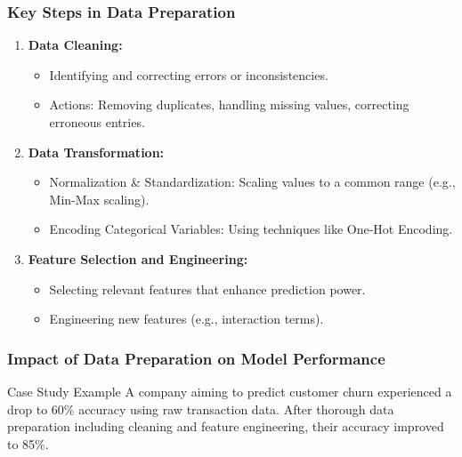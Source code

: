 \documentclass[aspectratio=169]{beamer}
\begin{document}
\begin{frame}[fragile]
    \frametitle{Key Steps in Data Preparation}
    \begin{enumerate}
        \item \textbf{Data Cleaning:}
        \begin{itemize}
            \item Identifying and correcting errors or inconsistencies. 
            \item Actions: Removing duplicates, handling missing values, correcting erroneous entries.
        \end{itemize}
        
        \item \textbf{Data Transformation:}
        \begin{itemize}
            \item Normalization & Standardization: Scaling values to a common range (e.g., Min-Max scaling).
            \item Encoding Categorical Variables: Using techniques like One-Hot Encoding.
        \end{itemize}
        
        \item \textbf{Feature Selection and Engineering:}
        \begin{itemize}
            \item Selecting relevant features that enhance prediction power.
            \item Engineering new features (e.g., interaction terms).
        \end{itemize}
    \end{enumerate}
\end{frame}

\begin{frame}[fragile]
    \frametitle{Impact of Data Preparation on Model Performance}
    \begin{block}{Case Study Example}
        A company aiming to predict customer churn experienced a drop to 60\% accuracy using raw transaction data. 
        After thorough data preparation including cleaning and feature engineering, their accuracy improved to 85\%.
    \end{block}
\end{frame}
\end{document}
